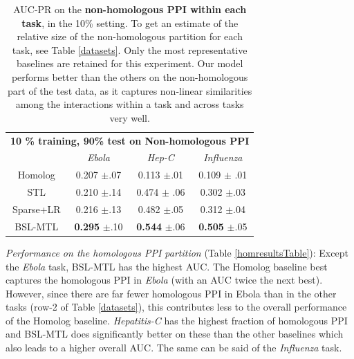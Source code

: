 \documentclass{bioinfo}
\begin{document}
\begin{table}[!h]
\caption{AUC-PR on the \textbf{non-homologous PPI within each task}, in the 10\% setting. To get an estimate of the relative size of the non-homologous partition for each task, see Table \ref{datasets}. Only the most representative baselines are retained for this experiment. Our model performs better than the others on the non-homologous part of the test data, as it captures non-linear similarities among the interactions within a task and across tasks very well.}
\label{nohomresultsTable}
\begin{small}
\begin{center}
\begin{tabular}{c|ccc}
\toprule
\multicolumn{4}{c}{\textbf{10 \% training, 90\% test on Non-homologous PPI}} \\
& \textit{Ebola} & \textit{Hep-C} & \textit{Influenza} \\ \midrule
Homolog & 0.207 $\pm$.07 & 0.113 $\pm$.01 & 0.109 $\pm$ .01 \\
STL  & 0.210 $\pm$.14 & 0.474 $\pm$ .06 & 0.302 $\pm$.03 \\
Sparse+LR & 0.216 $\pm$.13 & 0.482 $\pm$.05 & 0.312 $\pm$.04 \\ 
BSL-MTL & \textbf{0.295} $\pm$.10 & \textbf{0.544} $\pm$.06 & \textbf{0.505} $\pm$.05 \\ \bottomrule
\end{tabular}
\end{center}
\end{small}
\end{table}


\noindent\textit{Performance on the homologous PPI partition} (Table \ref{homresultsTable}):
Except the \textit{Ebola} task, BSL-MTL has the highest AUC. The Homolog baseline best captures the homologous PPI in \textit{Ebola} (with an AUC twice the next best). However, since there are far fewer homologous PPI in Ebola than in the other tasks (row-2 of Table \ref{datasets}), this contributes less to the overall performance of the Homolog baseline. \textit{Hepatitis-C} has the highest fraction of homologous PPI and BSL-MTL does significantly better on these than the other baselines which also leads to a higher overall AUC. The same can be said of the \textit{Influenza} task.

\end{document}
